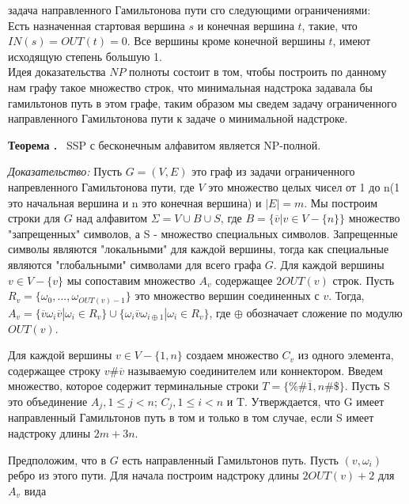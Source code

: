 \documentclass[11pt,a4paper]{article}
\newcommand\ifnonempty[2]{\ifthenelse{\equal{#1}{}}{}{#2}}
\newcounter{thm}
\newcommand{\thm}[1][]{\smallskip\par\hangafter=1\normalsize\textbf{Теорема \refstepcounter{thm}\thethm\ifnonempty{#1}{ (#1)}.}~}
\begin{document}
 задача направленного Гамильтонова пути сго следующими ограничениями:
\\Есть назначенная стартовая вершина $s$ и конечная вершина $t$, такие, что $IN(s) = OUT(t) = 0$. Все вершины кроме конечной вершины $t$, имеют исходящую степень большую 1.
\\ Идея доказательства $NP$ полноты состоит в том, чтобы построить по данному нам графу такое множество строк, что минимальная надстрока задавала бы гамильтонов путь в этом графе, таким образом мы сведем
задачу ограниченного направленного Гамильтонова пути к задаче о минимальной надстроке.
\thm
SSP с бесконечным алфавитом является  NP-полной.
\par
\textit{Доказательство:}
Пусть $G = (V, E)$ это граф из задачи ограниченного напревленного Гамильтонова пути, где $V$ это множество целых чисел от 1 до n(1 это начальная вершина и n это конечная вершина) и $|E| = m$.
Мы построим строки для $G$ над алфавитом $\Sigma = V \cup B \cup S$, где $B = \{\overline{v}| v \in V - \{n\} \}$ множество "запрещенных" символов, а S - множество специальных символов.
Запрещенные символы являются "локальными" для каждой вершины, тогда как специальные являются "глобальными" символами для всего графа $G$.
Для каждой вершины $v \in V - \{v\}$ мы сопоставим множество $A_v$ содержащее $2OUT(v)$ строк. Пусть $R_v = \{\omega_0, ..., \omega_{OUT(v) - 1}\}$ это множество вершин соединенных с $v$.
Тогда, $A_v = \{\overline{v}\omega_i\overline{v}|\omega_i \in R_v\} \cup \{\omega_i \overline{v}\omega_{i \oplus 1}| \omega_i \in R_v\}$, где $\oplus$ обозначает сложение по модулю $OUT(v)$.
\par
Для каждой вершины $v \in V - \{1, n\}$ создаем множество $C_v$ из одного элемента, содержащее строку $v \# \overline{v}$ называемую соединителем или коннектором.
Введем множество, которое содержит терминальные строки $T = \{\%\#\overline{1}, n\#\$\}$. Пусть S это объединение $A_j, 1 \le j < n$; $C_j, 1 \le i < n$ и T.
Утверждается, что G имеет направленный Гамильтонов путь в том и только в том случае, если S имеет надстроку длины $2m + 3n$.
\par
Предположим, что в $G$ есть направленный Гамильтонов путь. Пусть $(v, \omega_i)$ ребро из этого пути. Для начала построим надстроку длины $2OUT(v) + 2$ для $A_v$ вида
\end{document}
